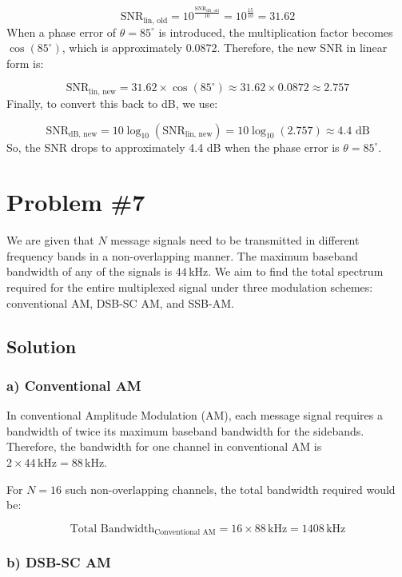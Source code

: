 \documentclass{article}
\begin{document}
\[
\text{SNR}_{\text{lin, old}} = 10^{\frac{\text{SNR}_{\text{dB, old}}}{10}} = 10^{\frac{15}{10}} = 31.62
\]
When a phase error of \(\theta = 85^\circ\) is introduced, the multiplication factor becomes \(\cos(85^\circ)\), which is approximately 0.0872. Therefore, the new SNR in linear form is:

\[
\text{SNR}_{\text{lin, new}} = 31.62 \times \cos(85^\circ) \approx 31.62 \times 0.0872 \approx 2.757
\]
Finally, to convert this back to dB, we use:

\[
\text{SNR}_{\text{dB, new}} = 10 \log_{10}(\text{SNR}_{\text{lin, new}}) = 10 \log_{10}(2.757) \approx 4.4 \text{ dB}
\]
So, the SNR drops to approximately 4.4 dB when the phase error is \(\theta = 85^\circ\).

\newpage
\section*{Problem \#7}

We are given that \(N\) message signals need to be transmitted in different frequency bands in a non-overlapping manner. The maximum baseband bandwidth of any of the signals is \(44 \, \text{kHz}\). We aim to find the total spectrum required for the entire multiplexed signal under three modulation schemes: conventional AM, DSB-SC AM, and SSB-AM.

\subsection*{Solution}

\subsubsection*{a) Conventional AM}

In conventional Amplitude Modulation (AM), each message signal requires a bandwidth of twice its maximum baseband bandwidth for the sidebands. Therefore, the bandwidth for one channel in conventional AM is \(2 \times 44 \, \text{kHz} = 88 \, \text{kHz}\).

For \(N = 16\) such non-overlapping channels, the total bandwidth required would be:

\[
\text{Total Bandwidth}_{\text{Conventional AM}} = 16 \times 88 \, \text{kHz} = 1408 \, \text{kHz}
\]

\subsubsection*{b) DSB-SC AM}
\end{document}
